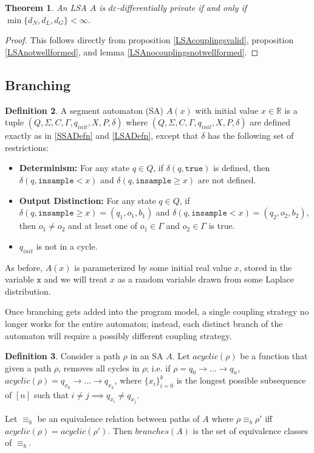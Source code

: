 \documentclass[12pt]{article}
\newcommand{\RR}{\mathbb{R}}
\newcommand{\gguard}[1][x]{\texttt{insample}\geq #1}
\newcommand{\lguard}[1][x]{\texttt{insample} < #1}
\newtheorem{thm}{Theorem}[section]
\theoremstyle{definition}
\newtheorem{defn}[thm]{Definition}
\begin{document}
\begin{thm}
    An LSA $A$ is $d\varepsilon$-differentially private if and only if $\min\{d_N, d_L, d_G\}<\infty$.
\end{thm}
\begin{proof}
    This follows directly from proposition \ref{LSAcouplingsvalid}, proposition \ref{LSAnotwellformed}, and lemma \ref{LSAnocouplingsnotwellformed}.
\end{proof}

\subsection{Branching}

\begin{defn}
    A segment automaton (SA) $A(x)$ with initial value $x\in \RR$ is a tuple $(Q, \Sigma, C, \Gamma, q_{init}, X, P, \delta)$ where $(Q, \Sigma, C, \Gamma, q_{init}, X, P, \delta)$ are defined exactly as in \ref{SSADefn} and \ref{LSADefn}, except that $\delta$ has the following set of restrictions: \begin{itemize}  
        \item \textbf{Determinism:} For any state $q\in Q$, if $\delta(q,\texttt{true})$ is defined, then $\delta(q,\lguard)$ and $\delta(q,\gguard)$ are not defined. 

        \item \textbf{Output Distinction:} For any state $q\in Q$, if $\delta(q, \gguard) = (q_1, o_1, b_1)$ and $\delta(q, \lguard) = (q_2, o_2, b_2)$, then $o_1\neq o_2$ and at least one of $o_1\in \Gamma$ and $o_2\in \Gamma$ is true.
        \item $q_{init}$ is not in a cycle. 
    \end{itemize}

    As before, $A(x)$ is parameterized by some initial real value $x$, stored in the variable $\texttt{x}$ and we will treat $x$ as a random variable drawn from some Laplace distribution.
\end{defn}

Once branching gets added into the program model, a single coupling strategy no longer works for the entire automaton; instead, each distinct branch of the automaton will require a possibly different coupling strategy. 

\begin{defn}
    Consider a path $\rho$ in an SA $A$. Let $acyclic(\rho)$ be a function that given a path $\rho$, removes all cycles in $\rho$; i.e. if $\rho = q_0\to \ldots\to q_n$, $acyclic(\rho) = q_{x_0}\to \ldots \to q_{x_k}$, where $\{x_i\}_{i=0}^k$ is the longest possible subsequence of $[n]$ such that $i\neq j\implies q_{x_i}\neq q_{x_j}$. 
    
    Let $\equiv_b$ be an equivalence relation between paths of $A$ where $\rho\equiv_b\rho'$ iff $acyclic(\rho) = acyclic(\rho')$. Then $branches(A)$ is the set of equivalence classes of $\equiv_b$. 
\end{defn}
\end{document}
